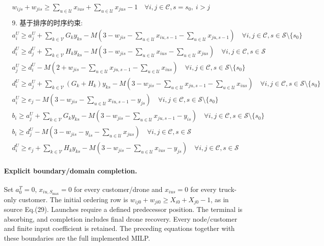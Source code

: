 \documentclass[11pt]{article}
\begin{document}
\[\begin{aligned}
&w_{ijs} + w_{jis} \ge \sum_{u \in \mathcal{U}} x_{ius} + \sum_{u \in \mathcal{U}} x_{jus}-1 \quad \forall i, j \in \mathcal{C}, s=s_0,\ i > j \\
\\
&\text{9. 基于排序的时序约束:} \\
&a^U_i \ge a^U_j + \sum_{k \in \mathcal{V}} G_k y_{ks} - M\left(3 - w_{jis} - \sum_{u \in \mathcal{U}} x_{iu,s-1} - \sum_{u \in \mathcal{U}} x_{ju,s-1}\right) \quad \forall i, j \in \mathcal{C}, s \in \mathcal{S} \setminus \{s_0\} \\
&d^U_i \ge d^U_j + \sum_{k \in \mathcal{V}} H_k y_{ks} - M\left(3 - w_{jis} - \sum_{u \in \mathcal{U}} x_{ius} - \sum_{u \in \mathcal{U}} x_{jus}\right) \quad \forall i, j \in \mathcal{C}, s \in \mathcal{S} \\
&a^U_j \ge d^U_i - M\left(2 + w_{jis} - \sum_{u \in \mathcal{U}} x_{ju,s-1} - \sum_{u \in \mathcal{U}} x_{ius}\right) \quad \forall i, j \in \mathcal{C}, s \in \mathcal{S} \setminus \{s_0\} \\
&d^U_i \ge a^U_j + \sum_{k \in \mathcal{V}} (G_k + H_k) y_{ks} - M\left(3 - w_{jis} - \sum_{u \in \mathcal{U}} x_{ju,s-1} - \sum_{u \in \mathcal{U}} x_{ius}\right) \quad \forall i, j \in \mathcal{C}, s \in \mathcal{S} \setminus \{s_0\} \\
&a^U_i \ge e_j - M\left(3 - w_{jis} - \sum_{u \in \mathcal{U}} x_{iu,s-1} - y_{js}\right) \quad \forall i, j \in \mathcal{C}, s \in \mathcal{S} \setminus \{s_0\} \\
&b_i \ge a^U_j + \sum_{k \in \mathcal{V}} G_k y_{ks} - M\left(3 - w_{jis} - \sum_{u \in \mathcal{U}} x_{ju,s-1} - y_{is}\right) \quad \forall i, j \in \mathcal{C}, s \in \mathcal{S} \setminus \{s_0\} \\
&b_i \ge d^U_j - M\left(3 - w_{jis} - y_{is} - \sum_{u \in \mathcal{U}} x_{jus}\right) \quad \forall i, j \in \mathcal{C}, s \in \mathcal{S} \\
&d^U_i \ge e_j + \sum_{k \in \mathcal{V}} H_k y_{ks} - M\left(3 - w_{jis} - \sum_{u \in \mathcal{U}} x_{ius} - y_{js}\right) \quad \forall i, j \in \mathcal{C}, s \in \mathcal{S}
\end{aligned}\]


\paragraph{Explicit boundary/domain completion.}
Set $a^T_0=0$, $x_{iu,S_{\max}}=0$ for every customer/drone and
$x_{ius}=0$ for every truck-only customer.
The initial ordering row is
$w_{ij0}+w_{ji0}\ge X_{i0}+X_{j0}-1$, as in source Eq.(29).
Launches require a defined predecessor position.
The terminal is absorbing, and completion includes final drone recovery.
Every node/customer and finite input coefficient is retained.
The preceding equations together with these boundaries are the full implemented
MILP.
\end{document}
